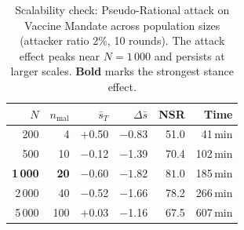 \begin{table}[!t]
\centering
\caption{Scalability check: Pseudo-Rational attack on Vaccine Mandate across population sizes (attacker ratio 2\%, 10 rounds). The attack effect peaks near $N{=}1\,000$ and persists at larger scales. \textbf{Bold} marks the strongest stance effect.}
\label{tab:scale}

\vspace{2pt}
\renewcommand{\arraystretch}{1.12}
\setlength{\tabcolsep}{2.8pt}
\scriptsize

\begin{tabular}{@{}r r r r r r@{}}

\toprule

{$N$} & {$n_\text{mal}$}
& {$\bar{s}_T$} & {$\Delta\bar{s}$} & {NSR}
& {Time}
\\

\midrule

200  & 4
  & $+$0.50 & $-$0.83 & 51.0
  & 41\,min
\\

\rowcolor{rowalt}
500  & 10
  & $-$0.12 & $-$1.39 & 70.4
  & 102\,min
\\

\rowcolor{peak}
\textbf{1\,000} & \textbf{20}
  & $\mathbf{-0.60}$ & $\mathbf{-1.82}$ & $\mathbf{81.0}$
  & 185\,min
\\

\rowcolor{rowalt}
2\,000  & 40
  & $-$0.52 & $-$1.66 & 78.2
  & 266\,min
\\

5\,000  & 100
  & $+$0.03 & $-$1.16 & 67.5
  & 607\,min
\\

\bottomrule

\end{tabular}
\end{table}
